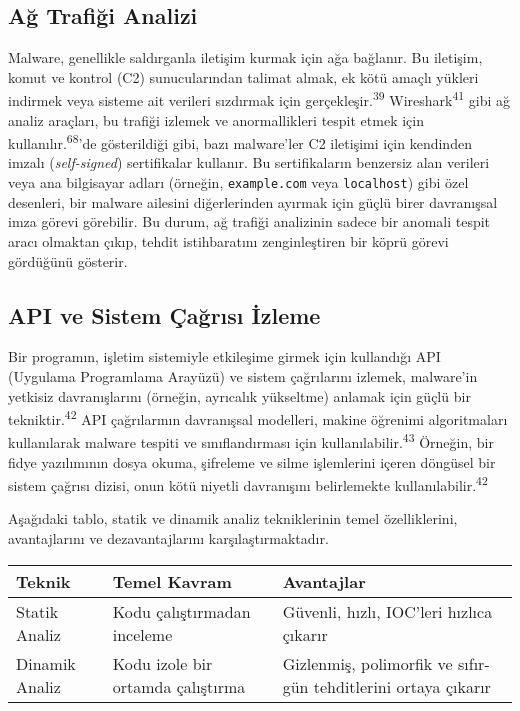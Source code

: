 \subsection{Ağ Trafiği Analizi}

Malware, genellikle saldırganla iletişim kurmak için ağa bağlanır. Bu iletişim, komut ve kontrol (C2) sunucularından talimat almak, ek kötü amaçlı yükleri indirmek veya sisteme ait verileri sızdırmak için gerçekleşir.\textsuperscript{39} Wireshark\textsuperscript{41} gibi ağ analiz araçları, bu trafiği izlemek ve anormallikleri tespit etmek için kullanılır.\textsuperscript{68}'de gösterildiği gibi, bazı malware'ler C2 iletişimi için kendinden imzalı (\textit{self-signed}) sertifikalar kullanır. Bu sertifikaların benzersiz alan verileri veya ana bilgisayar adları (örneğin, \texttt{example.com} veya \texttt{localhost}) gibi özel desenleri, bir malware ailesini diğerlerinden ayırmak için güçlü birer davranışsal imza görevi görebilir. Bu durum, ağ trafiği analizinin sadece bir anomali tespit aracı olmaktan çıkıp, tehdit istihbaratını zenginleştiren bir köprü görevi gördüğünü gösterir.

\subsection{API ve Sistem Çağrısı İzleme}

Bir programın, işletim sistemiyle etkileşime girmek için kullandığı API (Uygulama Programlama Arayüzü) ve sistem çağrılarını izlemek, malware'in yetkisiz davranışlarını (örneğin, ayrıcalık yükseltme) anlamak için güçlü bir tekniktir.\textsuperscript{42} API çağrılarının davranışsal modelleri, makine öğrenimi algoritmaları kullanılarak malware tespiti ve sınıflandırması için kullanılabilir.\textsuperscript{43} Örneğin, bir fidye yazılımının dosya okuma, şifreleme ve silme işlemlerini içeren döngüsel bir sistem çağrısı dizisi, onun kötü niyetli davranışını belirlemekte kullanılabilir.\textsuperscript{42}

Aşağıdaki tablo, statik ve dinamik analiz tekniklerinin temel özelliklerini, avantajlarını ve dezavantajlarını karşılaştırmaktadır.

\begin{tabular}{|p{4cm}|p{6cm}|p{4cm}|}
\hline
\hline
\textbf{Teknik} & \textbf{Temel Kavram} & \textbf{Avantajlar}  \\
\hline
\hline
Statik Analiz & Kodu çalıştırmadan inceleme & Güvenli, hızlı, IOC'leri hızlıca çıkarır  \\
\hline
\hline
Dinamik Analiz & Kodu izole bir ortamda çalıştırma & Gizlenmiş, polimorfik ve sıfır-gün tehditlerini ortaya çıkarır  \\
\hline
\hline
\hline
\end{tabular}


